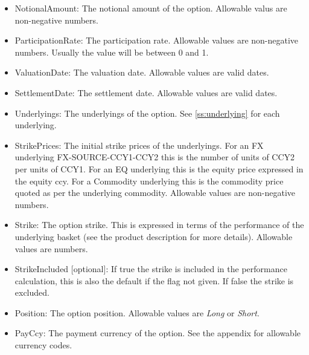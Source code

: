 \begin{itemize}
\item NotionalAmount: The notional amount of the option. Allowable valus are non-negative numbers.
\item ParticipationRate: The participation rate. Allowable values are non-negative numbers. Usually the value will be
  between 0 and 1.
\item ValuationDate: The valuation date.  Allowable values are valid dates.
\item SettlementDate: The settlement date. Allowable values are valid dates.
\item Underlyings: The underlyings of the option. See \ref{ss:underlying} for each underlying.
\item StrikePrices: The initial strike prices of the underlyings. For an FX underlying FX-SOURCE-CCY1-CCY2 this is the
  number of units of CCY2 per units of CCY1. For an EQ underlying this is the equity price expressed in the equity ccy. For a Commodity underlying this is the commodity price quoted as per the underlying commodity.
  Allowable values are non-negative numbers.
\item Strike: The option strike. This is expressed in terms of the performance of the underlying basket (see the product
  description for more details). Allowable values are numbers.
\item StrikeIncluded [optional]: If true the strike is included in the performance calculation, this is also the default
  if the flag not given. If false the strike is excluded. 
\item Position: The option position. Allowable values are {\em Long} or {\em Short}.
\item PayCcy: The payment currency of the option. See the appendix for allowable currency codes.
\end{itemize}
